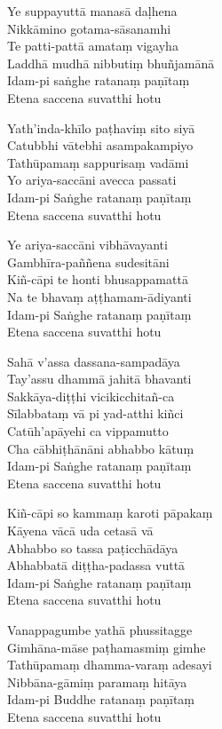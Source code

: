 \begin{paritta}
%
Ye suppayuttā manasā daḷhena\\
Nikkāmino gotama-sāsanamhi\\
Te patti-pattā amataṃ vigayha\\
Laddhā mudhā nibbutiṃ bhuñjamānā\\
Idam-pi saṅghe ratanaṃ paṇītaṃ\\
Etena saccena suvatthi hotu

Yath'inda-khīlo paṭhaviṃ sito siyā\\
Catubbhi vātebhi asampakampiyo\\
Tathūpamaṃ sappurisaṃ vadāmi\\
Yo ariya-saccāni avecca passati\\
Idam-pi Saṅghe ratanaṃ paṇītaṃ\\
Etena saccena suvatthi hotu

Ye ariya-saccāni vibhāvayanti\\
Gambhīra-paññena sudesitāni\\
Kiñ-cāpi te honti bhusappamattā\\
Na te bhavaṃ aṭṭhamam-ādiyanti\\
Idam-pi Saṅghe ratanaṃ paṇītaṃ\\
Etena saccena suvatthi hotu

Sahā v'assa dassana-sampadāya\\
Tay'assu dhammā jahitā bhavanti\\
Sakkāya-diṭṭhi vicikicchitañ-ca\\
Sīlabbataṃ vā pi yad-atthi kiñci\\
Catūh'apāyehi ca vippamutto\\
Cha cābhiṭhānāni abhabbo kātuṃ\\
Idam-pi Saṅghe ratanaṃ paṇītaṃ\\
Etena saccena suvatthi hotu

Kiñ-cāpi so kammaṃ karoti pāpakaṃ\\
Kāyena vācā uda cetasā vā\\
Abhabbo so tassa paṭicchādāya\\
Abhabbatā diṭṭha-padassa vuttā\\
Idam-pi Saṅghe ratanaṃ paṇītaṃ\\
Etena saccena suvatthi hotu

Vanappagumbe yathā phussitagge\\
Gimhāna-māse paṭhamasmiṃ gimhe\\
Tathūpamaṃ dhamma-varaṃ adesayi\\
Nibbāna-gāmiṃ paramaṃ hitāya\\
Idam-pi Buddhe ratanaṃ paṇītaṃ\\
Etena saccena suvatthi hotu


\end{paritta}
